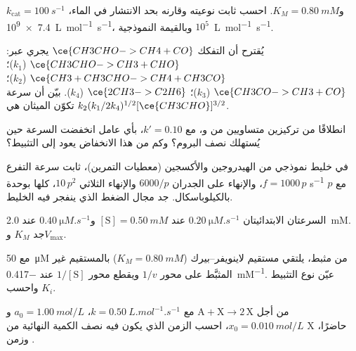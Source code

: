 \begin{exercise}[$\star$]\label{exo:b3:complex-kinetics:4}
 $k_{\mathrm{cat}} = \qty{100}{s^{-1}}$ و$K_M = \qty{0.80}{mM}$. احسب ثابت نوعيته
وقارنه بحد الانتشار في الماء، \qty{7.4e9}{L.mol^{-1}.s^{-1}}،
وبالقيمة النموذجية $10^5$~\unit{L.mol^{-1}.s^{-1}}.
\end{exercise}

\begin{exercise}[$\star\star$]\label{exo:b3:complex-kinetics:5}
يُقترح أن التفكك $\ce{CH3CHO -> CH4 + CO}$ يجري عبر: $\ce{CH3CHO -> CH3 +
CHO}$ ($k_1$)؛ $\ce{CH3 + CH3CHO -> CH4 + CH3CO}$ ($k_2$)؛ $\ce{CH3CO -> CH3 + CO}$ ($k_3$)؛
$\ce{2 CH3 -> C2H6}$ ($k_4$). بيّن أن سرعة تكوّن الميثان هي
$k_2(k_1/2k_4)^{1/2}[\ce{CH3CHO}]^{3/2}$.
\end{exercise}

\begin{exercise}[$\star\star$]\label{exo:b3:complex-kinetics:6}
انطلاقًا من تركيزين متساويين من  و، مع $k' = 0.10$، بأي
عامل انخفضت السرعة حين يُستهلك نصف البروم؟ وكم من هذا
الانخفاض يعود إلى التثبيط؟
\end{exercise}

\begin{exercise}[$\star\star$]\label{exo:b3:complex-kinetics:7}
في خليط نموذجي من الهيدروجين والأكسجين (معطيات التمرين)، ثابت سرعة التفرع
$f = 1000\,p$، والإنهاء على الجدران $6000/p$ والإنهاء الثلاثي
$10\,p^2$، كلها بوحدة \unit{s^{-1}} مع $p$ بالكيلوباسكال. جد مجال الضغط الذي
ينفجر فيه الخليط.
\end{exercise}

\begin{exercise}[$\star\star$]\label{exo:b3:complex-kinetics:8}
السرعتان الابتدائيتان $\qty{0.20}{\micro M.s^{-1}}$ عند $[\mathrm S] = \qty{0.50}{mM}$ و$\qty{0.40}{\micro M.s^{-1}}$ عند
\qty{2.0}{mM}. جد $K_M$ و$V_{\max}$.
\end{exercise}

\begin{exercise}[$\star\star$]\label{exo:b3:complex-kinetics:9}
مع \qty{50}{\micro M} من مثبط، يلتقي مستقيم لاينويفر--بيرك 
($K_M = \qty{0.80}{mM}$) بالمستقيم غير المثبَّط على محور $1/v$ ويقطع محور
$1/[\mathrm S]$ عند \qty{-0.417}{mM^{-1}}. عيّن نوع التثبيط واحسب $K_i$.
\end{exercise}

\begin{exercise}[$\star\star\star$]\label{exo:b3:complex-kinetics:10}
من أجل $\mathrm{A + X \to 2\,X}$ مع $k = \qty{0.50}{L.mol^{-1}.s^{-1}}$، $a_0 = \qty{1.00}{mol/L}$ و$x_0 = \qty{0.010}{mol/L}$،
احسب الزمن الذي يكون فيه نصف الكمية النهائية من X حاضرًا، 
وزمن .
\end{exercise}

